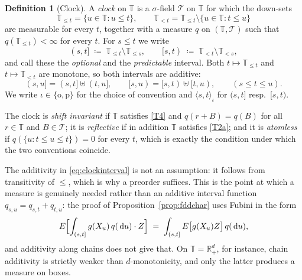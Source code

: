 \documentclass[11pt,a4paper]{article}
\theoremstyle{plain}
\theoremstyle{definition}
\newtheorem{definition}[theorem]{Definition}
\theoremstyle{remark}
\newcommand{\R}{\mathbb{R}}
\newcommand{\Rp}{\R_+}
\newcommand{\T}{\mathbb{T}}                     %
\newcommand{\dif}{\,\mathrm{d}}
\begin{document}
\begin{definition}[Clock]
  \label{def:clock}
  A \emph{clock} on $\T$ is a $\sigma$-field $\mathcal{T}$ on $\T$ for which the
  down-sets
  \[
    \T_{\leq t} = \{u \in \T : u \leq t\} ,
    \qquad
    \T_{<t} = \T_{\leq t} \setminus \{ u \in \T : t \leq u \}
  \]
  are measurable for every $t$, together with a measure $q$ on
  $(\T,\mathcal{T})$ such that $q(\T_{\leq t}) < \infty$ for every $t$.  For
  $s \leq t$ we write
  \begin{equation}
    \label{eq:clockinterval}
    (s,t] \;\coloneqq\; \T_{\leq t} \setminus \T_{\leq s} ,
    \qquad
    [s,t) \;\coloneqq\; \T_{<t} \setminus \T_{<s} ,
  \end{equation}
  and call these the \emph{optional} and the \emph{predictable} interval.  Both
  $t \mapsto \T_{\leq t}$ and $t \mapsto \T_{<t}$ are monotone, so both intervals
  are additive:
  \begin{equation}
    \label{eq:clockadd}
    (s,u] = (s,t] \uplus (t,u] , \qquad
    [s,u) = [s,t) \uplus [t,u) , \qquad (s \leq t \leq u) .
  \end{equation}
  We write $\iota \in \{\mathrm{o},\mathrm{p}\}$ for the choice of convention and
  $\langle s,t \rangle_\iota$ for $(s,t]$ resp.\ $[s,t)$.

  The clock is \emph{shift invariant} if $\T$ satisfies \eqref{T4} and
  $q(r + B) = q(B)$ for all $r \in \T$ and $B \in \mathcal{T}$; it is
  \emph{reflective} if in addition $\T$ satisfies \eqref{T2a}; and it is
  \emph{atomless} if $q(\{u : t \leq u \leq t\}) = 0$ for every $t$, which is
  exactly the condition under which the two conventions coincide.
\end{definition}

The additivity in \eqref{eq:clockinterval} is not an assumption: it follows from
transitivity of $\leq$, which is why a preorder suffices.  This is the point at
which a measure is genuinely needed rather than an additive interval function
$q_{s,u} = q_{s,t} + q_{t,u}$: the proof of
Proposition~\ref{prop:fddchar} uses Fubini in the form
\[
  E\Bigl[ \int_{(s,t]} g(X_u)\, q(\dif u) \cdot Z \Bigr]
    \;=\; \int_{(s,t]} E\bigl[ g(X_u) Z \bigr]\, q(\dif u) ,
\]
and additivity along chains does not give that.  On $\T = \Rp^d$, for instance,
chain additivity is strictly weaker than $d$-monotonicity, and only the latter
produces a measure on boxes.
\end{document}
